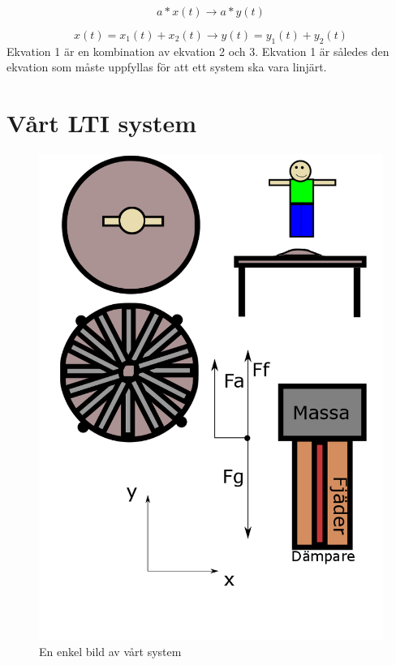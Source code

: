 \documentclass[10pt,a4paper]{article}
\begin{document}
\begin{equation}
a*x(t) \rightarrow a*y(t) 
\end{equation}

\begin{equation}
x(t) = x_1(t) + x_2(t) \rightarrow y(t) = y_1(t) + y_2(t)
\end{equation}
\linebreak
Ekvation 1 är en kombination av ekvation 2 och 3. Ekvation 1 är således den ekvation som måste uppfyllas för att ett system ska vara linjärt.


\newpage
\section{Vårt LTI system}

\begin{figure}[ht]
\caption{En enkel bild av vårt system}
\includegraphics[scale=0.4]{Bild}
\end{figure}
\clearpage
\end{document}
